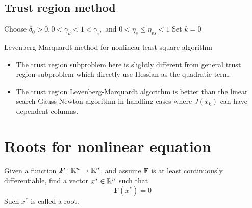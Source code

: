 \begin{refsection}
\subsection{Trust region method}

\begin{algorithm}[H]
	\SetAlgoLined
	Choose $\delta_0 > 0, 0 < \gamma_d < 1 < \gamma_i,$ and $0 < \eta_s \leq \eta_{vs} < 1$
	Set $k = 0$
	\caption{Levenberg-Marquardt method for nonlinear least-square algorithm}
\end{algorithm}


\begin{remark}[interpretation]\hfill
\begin{itemize}
	\item The trust region subproblem here is slightly different from general trust region subproblem which directly use Hessian as the quadratic term.
	\item The trust region Levenberg-Marquardt algorithm is better than the linear search Gauss-Newton algorithm in handling cases where $J(x_k)$ can have dependent columns.
\end{itemize}

 

\end{remark}



\section{Roots for nonlinear equation}
\begin{definition}
Given a function $\bm{F}:\mathbb{R}^n\to \mathbb{R}^n$, and assume $\bm{F}$ is at least continuously differentiable, find a vector $x^*\in \mathbb{R}^n$ such that
$$\bm{F}(x^*) = 0$$
Such $x^*$ is called a root.
\end{definition}


\end{refsection}

